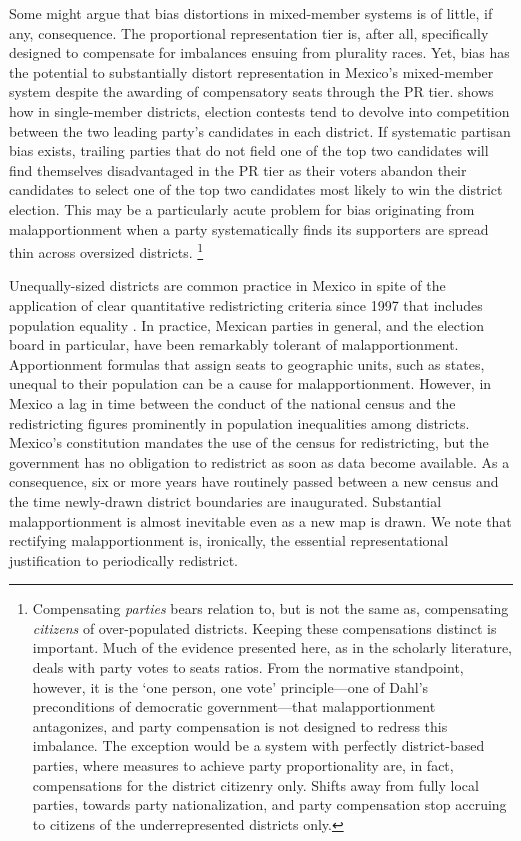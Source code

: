 \documentclass[letter,12pt]{article}
\begin{document}
Some might argue that bias distortions in mixed-member systems is of little, if any, consequence. The proportional representation tier is, after all, specifically designed to compensate for imbalances ensuing from plurality races. Yet, bias has the potential to substantially distort representation in Mexico's mixed-member system despite the awarding of compensatory seats through the PR tier. \citet{cox.1997} shows how in single-member districts, election contests tend to devolve into competition between the two leading party's candidates in each district. If systematic partisan bias exists, trailing parties that do not field one of the top two candidates will find themselves disadvantaged in the PR tier as their voters abandon their candidates to select one of the top two candidates most likely to win the district election. This may be a particularly acute problem for bias originating from malapportionment when a party systematically finds its supporters are spread thin across oversized districts. \footnote{Compensating \emph{parties} bears relation to, but is not the same as, compensating \emph{citizens} of over-populated districts. Keeping these compensations distinct is important. Much of the evidence presented here, as in the scholarly literature, deals with party votes to seats ratios. From the normative standpoint, however, it is the `one person, one vote' principle---one of Dahl's \citeyearpar{dahl.1972} preconditions of democratic government---that malapportionment antagonizes, and party compensation is not designed to redress this imbalance. The exception would be a system with perfectly district-based parties, where measures to achieve party proportionality are, in fact, compensations for the district citizenry only. Shifts away from fully local parties, towards party nationalization, and party compensation stop accruing to citizens of the underrepresented districts only.}  

Unequally-sized districts are common practice in Mexico in spite of the application of clear quantitative redistricting criteria since 1997 that includes population equality \citep{altman.magar.mcd.trelles2014apsa}. In practice, Mexican parties in general, and the election board in particular, have been remarkably tolerant of malapportionment. Apportionment formulas that assign seats to geographic units, such as states, unequal to their population can be a cause for malapportionment. However, in Mexico a lag in time between the conduct of the national census and the redistricting figures prominently in population inequalities among districts. Mexico's constitution mandates the use of the census for redistricting, but the government has no obligation to redistrict as soon as data become available. As a consequence, six or more years have routinely passed between a new census and the time newly-drawn district boundaries are inaugurated. Substantial malapportionment is almost inevitable even as a new map is drawn. We note that rectifying malapportionment is, ironically, the essential representational justification to periodically redistrict.
\end{document}
